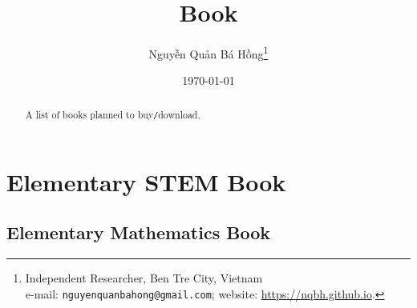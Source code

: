 \documentclass{article}
\title{Book}
\author{\selectlanguage{vietnamese} Nguyễn Quản Bá Hồng\footnote{Independent Researcher, Ben Tre City, Vietnam\\e-mail: \texttt{nguyenquanbahong@gmail.com}; website: \url{https://nqbh.github.io}.}}
\date{\today}
\numberwithin{equation}{section}
\begin{document}
\maketitle
{}
\begin{abstract}
	A list of books planned to buy\texttt{/}download.
\end{abstract}


\section{Elementary STEM Book}

\subsection{Elementary Mathematics Book}
\end{document}
